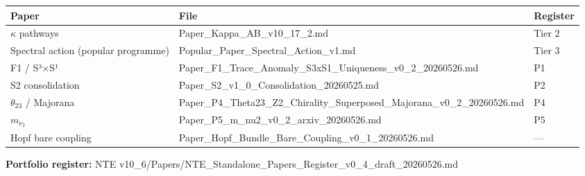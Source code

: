 \documentclass[
  11pt,
]{article}
\newcounter{none} %
\begin{document}
{\def\LTcaptype{none} %
\begin{longtable}[]{@{}
  >{\raggedright\arraybackslash}p{}
  >{\raggedright\arraybackslash}p{}
  >{\raggedright\arraybackslash}p{}@{}}
\toprule\noalign{}
\begin{minipage}[b]{\linewidth}\raggedright
Paper
\end{minipage} & \begin{minipage}[b]{\linewidth}\raggedright
File
\end{minipage} & \begin{minipage}[b]{\linewidth}\raggedright
Register
\end{minipage} \\
\midrule\noalign{}
\endhead
\bottomrule\noalign{}
\endlastfoot
\(\kappa\) pathways &
Paper\_\allowbreak{}Kappa\_\allowbreak{}AB\_\allowbreak{}v10\_\allowbreak{}17\_\allowbreak{}2.md
& Tier 2 \\
Spectral action (popular programme) &
Popular\_\allowbreak{}Paper\_\allowbreak{}Spectral\_\allowbreak{}Action\_\allowbreak{}v1.md
& Tier 3 \\
F1 /\allowbreak{} S³×S¹ &
Paper\_\allowbreak{}F1\_\allowbreak{}Trace\_\allowbreak{}Anomaly\_\allowbreak{}S3xS1\_\allowbreak{}Uniqueness\_\allowbreak{}v0\_\allowbreak{}2\_\allowbreak{}20260526.md
& P1 \\
S2 consolidation &
Paper\_\allowbreak{}S2\_\allowbreak{}v1\_\allowbreak{}0\_\allowbreak{}Consolidation\_\allowbreak{}20260525.md
& P2 \\
\(\theta_{23}\) /\allowbreak{} Majorana &
Paper\_\allowbreak{}P4\_\allowbreak{}Theta23\_\allowbreak{}Z2\_\allowbreak{}Chirality\_\allowbreak{}Superposed\_\allowbreak{}Majorana\_\allowbreak{}v0\_\allowbreak{}2\_\allowbreak{}20260526.md
& P4 \\
\(m_{\nu_2}\) &
Paper\_\allowbreak{}P5\_\allowbreak{}m\_\allowbreak{}nu2\_\allowbreak{}v0\_\allowbreak{}2\_\allowbreak{}arxiv\_\allowbreak{}20260526.md
& P5 \\
Hopf bare coupling &
Paper\_\allowbreak{}Hopf\_\allowbreak{}Bundle\_\allowbreak{}Bare\_\allowbreak{}Coupling\_\allowbreak{}v0\_\allowbreak{}1\_\allowbreak{}20260526.md
& --- \\
\end{longtable}
}

\textbf{Portfolio register:} NTE
v10\_6/Papers/NTE\_Standalone\_Papers\_Register\_v0\_4\_draft\_20260526.md
\end{document}
